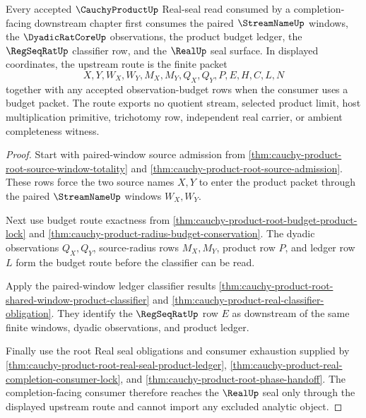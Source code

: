 \begin{theorem}
\label{thm:cauchy-product-real-seal-upstream-dependency}
Every accepted $\CauchyProductUp$ Real-seal read consumed by a completion-facing downstream chapter first consumes the paired $\StreamNameUp$ windows, the $\DyadicRatCoreUp$ observations, the product budget ledger, the $\RegSeqRatUp$ classifier row, and the $\RealUp$ seal surface. In displayed coordinates, the upstream route is the finite packet
$$
X,Y,W_X,W_Y,M_X,M_Y,Q_X,Q_Y,P,E,H,C,L,N
$$
together with any accepted observation-budget rows when the consumer uses a budget packet. The route exports no quotient stream, selected product limit, host multiplication primitive, trichotomy row, independent real carrier, or ambient completeness witness.
\end{theorem}
\begin{proof}
Start with paired-window source admission from \autoref{thm:cauchy-product-root-source-window-totality} and \autoref{thm:cauchy-product-root-source-admission}. These rows force the two source names $X,Y$ to enter the product packet through the paired $\StreamNameUp$ windows $W_X,W_Y$.

Next use budget route exactness from \autoref{thm:cauchy-product-root-budget-product-lock} and \autoref{thm:cauchy-product-radius-budget-conservation}. The dyadic observations $Q_X,Q_Y$, source-radius rows $M_X,M_Y$, product row $P$, and ledger row $L$ form the budget route before the classifier can be read.

Apply the paired-window ledger classifier results \autoref{thm:cauchy-product-root-shared-window-product-classifier} and \autoref{thm:cauchy-product-real-classifier-obligation}. They identify the $\RegSeqRatUp$ row $E$ as downstream of the same finite windows, dyadic observations, and product ledger.

Finally use the root Real seal obligations and consumer exhaustion supplied by \autoref{thm:cauchy-product-root-real-seal-product-ledger}, \autoref{thm:cauchy-product-real-completion-consumer-lock}, and \autoref{thm:cauchy-product-root-phase-handoff}. The completion-facing consumer therefore reaches the $\RealUp$ seal only through the displayed upstream route and cannot import any excluded analytic object.
\end{proof}

